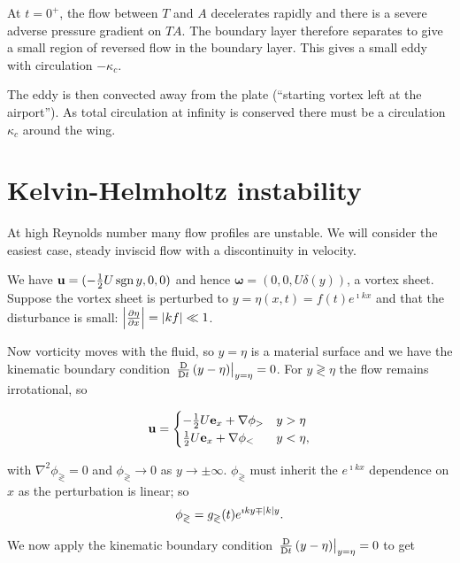 \documentclass{notes}
\newcommand{\om}{\boldsymbol{\omega}}
\newcommand{\e}{\mathbf{e}}
\theoremstyle{plain}
\begin{document}
\vspace{1in}

At $t=0^+$, the flow between $T$ and $A$ decelerates rapidly and there
is a severe adverse pressure gradient on $TA$.  The boundary layer therefore
separates to give a small region of reversed flow in the boundary layer.
This gives a small eddy with circulation $-\kappa_c$.

\vspace{1in}

The eddy is then convected away from the plate (``starting vortex left at
the airport'').  As total circulation at infinity is conserved there
must be a circulation $\kappa_c$ around the wing.

\vspace{1in}

\chapter{Kelvin-Helmholtz instability}

At high Reynolds number many flow profiles are unstable.  We will consider
the easiest case, steady inviscid flow with a discontinuity in velocity.

\vspace{1in}

We have $\mathbf{u} = (-\tfrac{1}{2} U \operatorname{sgn} y,0,0)$ and hence
$\om = (0,0,U \delta(y))$, a vortex sheet.  Suppose the vortex
sheet is perturbed to $y = \eta(x,t) = f(t) e^{\imath k x}$ and that
the disturbance is small: $\left|\frac{\partial \eta}{\partial x}\right| = \left|k f\right| \ll 1$.

Now vorticity moves with the fluid, so $y = \eta$ is a material
surface and we have the kinematic boundary condition
$\left.\frac{\mathrm{D}}{\mathrm{D} t}\left(y -\eta\right)\right|_{y = \eta} = 0$.  For $y
\gtrless \eta$ the flow remains irrotational, so

\[
\vu = \begin{cases}
- \tfrac{1}{2} U \e_x + \nabla \phi_> & y > \eta \\
\tfrac{1}{2} U \e_x + \nabla \phi_< & y < \eta,
\end{cases}
\]

with $\nabla^2 \phi_\gtrless = 0$ and $\phi_\gtrless \to 0$ as
$y \to \pm \infty$.  $\phi_\gtrless$ must inherit the
$e^{\imath k x}$ dependence on $x$ as the perturbation is linear; so
\[
\phi_\gtrless = g_\gtrless(t) e^{\imath k y \mp \left|k\right| y}.
\]

We now apply the kinematic boundary condition $\left.\frac{\mathrm{D}}{\mathrm{D} t} \left( y- \eta
\right)\right|_{y = \eta} = 0$ to get
\end{document}
